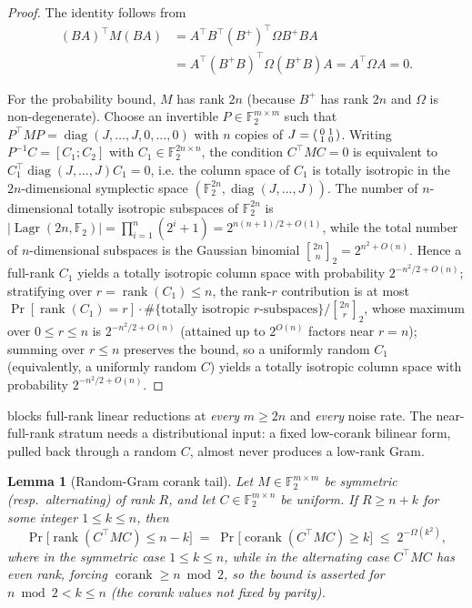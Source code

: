 \documentclass[11pt,a4paper]{article}
\theoremstyle{plain}
\newtheorem{lemma}[theorem]{Lemma}
\theoremstyle{definition}
\newcommand{\F}{\mathbb{F}}
\DeclareMathOperator{\Lagr}{Lagr}
\begin{document}
\begin{proof}
The identity follows from
\begin{align*}
(BA)^{\top} M (BA)
&= A^{\top} B^{\top} (B^{+})^{\top} \Omega B^{+} B A \\
&= A^{\top} (B^{+}B)^{\top} \Omega (B^{+}B) A
= A^{\top}\Omega A = 0.
\end{align*}

For the probability bound, $M$ has rank $2n$ (because $B^{+}$ has rank $2n$ and $\Omega$ is non-degenerate). Choose an invertible $P \in \F_2^{m \times m}$ such that $P^{\top} M P = \operatorname{diag}(J,\dots,J,0,\dots,0)$ with $n$ copies of $J = \begin{psmallmatrix}0&1\\1&0\end{psmallmatrix}$. Writing $P^{-1}C = [C_1; C_2]$ with $C_1 \in \F_2^{2n \times n}$, the condition $C^{\top} M C = 0$ is equivalent to $C_1^{\top} \operatorname{diag}(J,\dots,J) C_1 = 0$, i.e. the column space of $C_1$ is totally isotropic in the $2n$-dimensional symplectic space $(\F_2^{2n}, \operatorname{diag}(J,\dots,J))$. The number of $n$-dimensional totally isotropic subspaces of $\F_2^{2n}$ is $|\Lagr(2n,\F_2)| = \prod_{i=1}^n (2^i+1) = 2^{n(n+1)/2+O(1)}$, while the total number of $n$-dimensional subspaces is the Gaussian binomial ${2n \brack n}_2 = 2^{n^2+O(n)}$. Hence a full-rank $C_1$ yields a totally isotropic column space with probability $2^{-n^2/2+O(n)}$; stratifying over $r=\operatorname{rank}(C_1)\le n$, the rank-$r$ contribution is at most $\Pr[\operatorname{rank}(C_1)=r]\cdot\#\{\text{totally isotropic }r\text{-subspaces}\}/{2n\brack r}_2$, whose maximum over $0\le r\le n$ is $2^{-n^2/2+O(n)}$ (attained up to $2^{O(n)}$ factors near $r=n$); summing over $r\le n$ preserves the bound, so a uniformly random $C_1$ (equivalently, a uniformly random $C$) yields a totally isotropic column space with probability $2^{-n^2/2+O(n)}$.
\end{proof}

 blocks full-rank linear reductions at \emph{every} $m \ge 2n$ and \emph{every} noise rate. The near-full-rank stratum needs a distributional input: a fixed low-corank bilinear form, pulled back through a random $C$, almost never produces a low-rank Gram.

\begin{lemma}[Random-Gram corank tail]
\label{lem:random-gram-corank}
Let $M \in \F_2^{m \times m}$ be symmetric (resp.\ alternating) of rank $R$, and let $C \in \F_2^{m \times n}$ be uniform. If $R \ge n + k$ for some integer $1 \le k \le n$, then
\[
\Pr\bigl[\operatorname{rank}(C^{\top} M C) \le n-k\bigr]
\;=\; \Pr\bigl[\operatorname{corank}(C^{\top} M C) \ge k\bigr]
\;\le\; 2^{-\Omega(k^2)},
\]
where in the symmetric case $1 \le k \le n$, while in the alternating case $C^{\top}MC$ has even rank, forcing $\operatorname{corank} \ge n \bmod 2$, so the bound is asserted for $n \bmod 2 < k \le n$ (the corank values not fixed by parity).
\end{lemma}
\end{document}

